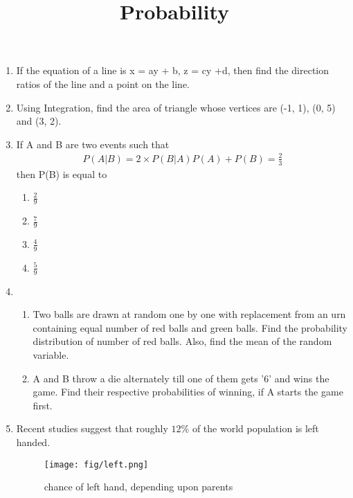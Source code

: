 \documentclass{article}
\begin{document}
\begin{enumerate}
\item If the equation of a line is x = ay + b, z = cy +d, then find the direction ratios of the line and a point on the line.

\item Using Integration, find the area of triangle whose vertices are (-1, 1), (0, 5) and (3, 2).

	\newpage

\title{\textbf{Probability}}
\date{}		
\maketitle
	
	\item If A and B are two events such that 
		\begin{align*}
			P(A|B) = 2 \times  P(B|A)P(A) + P(B)  = \frac{2}{3}
		\end{align*}then P(B)  is equal to
\begin{enumerate}
\item $\frac{2}{9}$
\item $\frac{7}{9}$
\item $\frac{4}{9}$
\item $\frac{5}{9}$
\end{enumerate}

\item
\begin{enumerate}
\item Two balls are drawn at random one by one with replacement from an urn containing equal number of red balls and green balls. Find the probability distribution of number of red balls. Also, find the mean of the random variable.
\item A and B throw a die alternately till one of them gets '6' and wins the game. Find their respective probabilities of winning, if A starts the game first.
\end{enumerate}

\item Recent studies suggest that roughly $12\%$ of the world population is left handed.
	
\begin{figure}[h!]
\centering
\texttt{[image: fig/left.png]}
\caption{chance of left hand, depending upon parents}
\label{fig:left.png}
\end{figure}


\end{enumerate}
\end{document}

